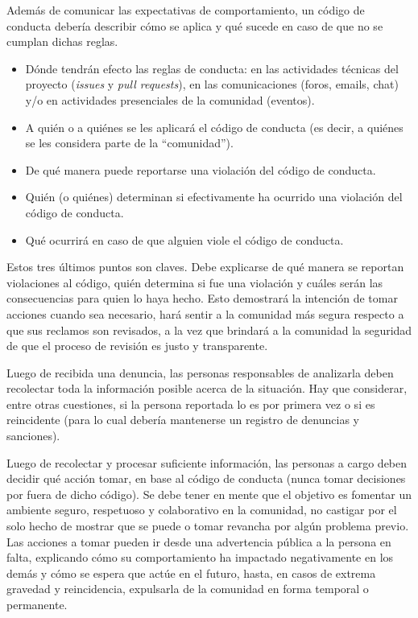 Además de comunicar las expectativas de comportamiento, un código de conducta debería describir cómo se aplica y qué sucede en caso de que no se cumplan dichas reglas.

\begin{itemize}
	\item Dónde tendrán efecto las reglas de conducta: en las actividades técnicas del proyecto (\emph{issues} y \emph{pull requests}), en las comunicaciones (foros, emails, chat) y/o en actividades presenciales de la comunidad (eventos).
	\item A quién o a quiénes se les aplicará el código de conducta (es decir, a quiénes se les considera parte de la ``comunidad'').
	\item De qué manera puede reportarse una violación del código de conducta.
	\item Quién (o quiénes) determinan si efectivamente ha ocurrido una violación del código de conducta.
	\item Qué ocurrirá en caso de que alguien viole el código de conducta. 
\end{itemize}

Estos tres últimos puntos son claves. Debe explicarse de qué manera se reportan violaciones al código, quién determina si fue una violación y cuáles serán las consecuencias para quien lo haya hecho. Esto demostrará la intención de tomar acciones cuando sea necesario, hará sentir a la comunidad más segura respecto a que sus reclamos son revisados, a la vez que brindará a la comunidad la seguridad de que el proceso de revisión es justo y transparente.

Luego de recibida una denuncia, las personas responsables de analizarla deben recolectar toda la información posible acerca de la situación. Hay que considerar, entre otras cuestiones, si la persona reportada lo es por primera vez o si es reincidente (para lo cual debería mantenerse un registro de denuncias y sanciones).

Luego de recolectar y procesar suficiente información, las personas a cargo deben decidir qué acción tomar, en base al código de conducta (nunca tomar decisiones por fuera de dicho código). Se debe tener en mente que el objetivo es fomentar un ambiente seguro, respetuoso y colaborativo en la comunidad, no castigar por el solo hecho de mostrar que se puede o tomar revancha por algún problema previo. Las acciones a tomar pueden ir desde una advertencia pública a la persona en falta, explicando cómo su comportamiento ha impactado negativamente en los demás y cómo se espera que actúe en el futuro, hasta, en casos de extrema gravedad y reincidencia, expulsarla de la comunidad en forma temporal o permanente.

